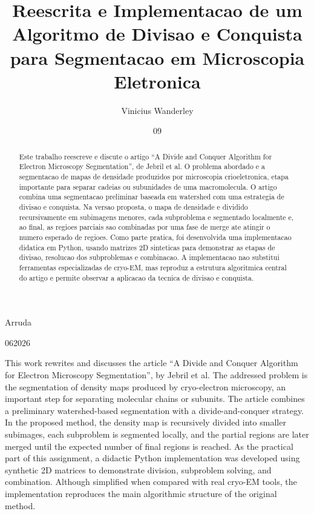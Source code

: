 \documentclass[tcc1]{uftex}
\begin{document}
\title{Reescrita e Implementacao de um Algoritmo de Divisao e Conquista para Segmentacao em Microscopia Eletronica}
\author{Vinicius Wanderley}{Arruda}
\date{09}{06}{2026}



\maketitle
\frontmatter

\begin{abstract}
Este trabalho reescreve e discute o artigo ``A Divide and Conquer Algorithm for Electron Microscopy Segmentation'', de Jebril et al. O problema abordado e a segmentacao de mapas de densidade produzidos por microscopia crioeletronica, etapa importante para separar cadeias ou subunidades de uma macromolecula. O artigo combina uma segmentacao preliminar baseada em watershed com uma estrategia de divisao e conquista. Na versao proposta, o mapa de densidade e dividido recursivamente em subimagens menores, cada subproblema e segmentado localmente e, ao final, as regioes parciais sao combinadas por uma fase de merge ate atingir o numero esperado de regioes. Como parte pratica, foi desenvolvida uma implementacao didatica em Python, usando matrizes 2D sinteticas para demonstrar as etapas de divisao, resolucao dos subproblemas e combinacao. A implementacao nao substitui ferramentas especializadas de cryo-EM, mas reproduz a estrutura algoritmica central do artigo e permite observar a aplicacao da tecnica de divisao e conquista.
\end{abstract}

\begin{foreignabstract}
This work rewrites and discusses the article ``A Divide and Conquer Algorithm for Electron Microscopy Segmentation'', by Jebril et al. The addressed problem is the segmentation of density maps produced by cryo-electron microscopy, an important step for separating molecular chains or subunits. The article combines a preliminary watershed-based segmentation with a divide-and-conquer strategy. In the proposed method, the density map is recursively divided into smaller subimages, each subproblem is segmented locally, and the partial regions are later merged until the expected number of final regions is reached. As the practical part of this assignment, a didactic Python implementation was developed using synthetic 2D matrices to demonstrate division, subproblem solving, and combination. Although simplified when compared with real cryo-EM tools, the implementation reproduces the main algorithmic structure of the original method.
\end{foreignabstract}
\end{document}
